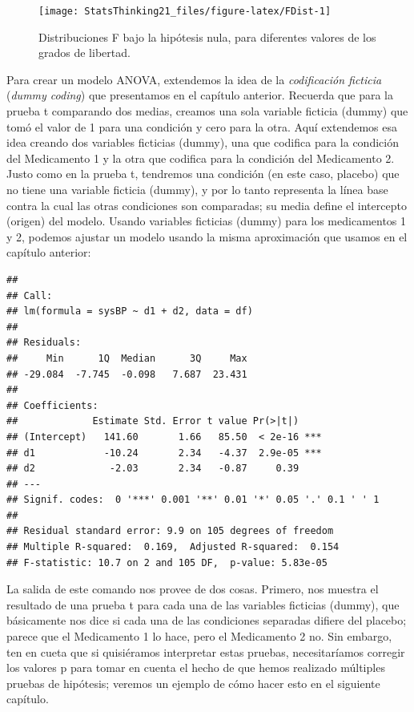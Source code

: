\documentclass[
  12pt,
]{book}
\begin{document}
\begin{figure}
\texttt{[image: StatsThinking21\_files/figure-latex/FDist-1]} \caption{Distribuciones F bajo la hipótesis nula, para diferentes valores de los grados de libertad.}\label{fig:FDist}
\end{figure}

Para crear un modelo ANOVA, extendemos la idea de la \emph{codificación ficticia} (\emph{dummy coding}) que presentamos en el capítulo anterior. Recuerda que para la prueba t comparando dos medias, creamos una sola variable ficticia (dummy) que tomó el valor de 1 para una condición y cero para la otra. Aquí extendemos esa idea creando dos variables ficticias (dummy), una que codifica para la condición del Medicamento 1 y la otra que codifica para la condición del Medicamento 2. Justo como en la prueba t, tendremos una condición (en este caso, placebo) que no tiene una variable ficticia (dummy), y por lo tanto representa la línea base contra la cual las otras condiciones son comparadas; su media define el intercepto (origen) del modelo. Usando variables ficticias (dummy) para los medicamentos 1 y 2, podemos ajustar un modelo usando la misma aproximación que usamos en el capítulo anterior:

\begin{verbatim}
## 
## Call:
## lm(formula = sysBP ~ d1 + d2, data = df)
## 
## Residuals:
##     Min      1Q  Median      3Q     Max 
## -29.084  -7.745  -0.098   7.687  23.431 
## 
## Coefficients:
##             Estimate Std. Error t value Pr(>|t|)    
## (Intercept)   141.60       1.66   85.50  < 2e-16 ***
## d1            -10.24       2.34   -4.37  2.9e-05 ***
## d2             -2.03       2.34   -0.87     0.39    
## ---
## Signif. codes:  0 '***' 0.001 '**' 0.01 '*' 0.05 '.' 0.1 ' ' 1
## 
## Residual standard error: 9.9 on 105 degrees of freedom
## Multiple R-squared:  0.169,  Adjusted R-squared:  0.154 
## F-statistic: 10.7 on 2 and 105 DF,  p-value: 5.83e-05
\end{verbatim}

La salida de este comando nos provee de dos cosas. Primero, nos muestra el resultado de una prueba t para cada una de las variables ficticias (dummy), que básicamente nos dice si cada una de las condiciones separadas difiere del placebo; parece que el Medicamento 1 lo hace, pero el Medicamento 2 no. Sin embargo, ten en cueta que si quisiéramos interpretar estas pruebas, necesitaríamos corregir los valores p para tomar en cuenta el hecho de que hemos realizado múltiples pruebas de hipótesis; veremos un ejemplo de cómo hacer esto en el siguiente capítulo.
\end{document}
